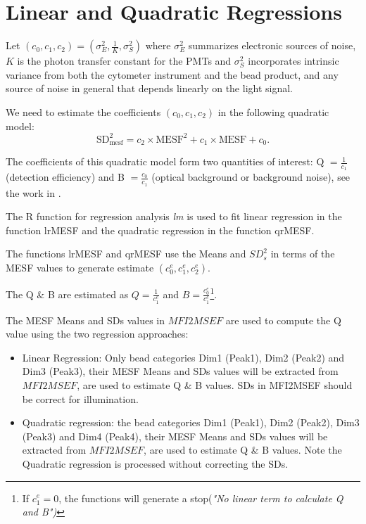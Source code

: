 \documentclass{article}
\begin{document}
\section{Linear and Quadratic Regressions}\label{reg}

Let $(c_0,c_1,c_2) = (\sigma_{E}^{2},\frac{1}{K},\sigma^{2}_{S})$ where $\sigma^2_{E}$ summarizes electronic sources of noise, $K$ is the photon transfer constant for the PMTs and  $\sigma^{2}_S$ incorporates intrinsic variance from both the cytometer instrument and the bead product, and any source of noise in general that depends linearly on the light signal. 

We need to estimate the coefficients $(c_0,c_1,c_2)$ in the following quadratic model:
\begin{equation}
\text{SD}_{\text{mesf}}^{2} =c_{2} \times \text{MESF}^{2}+ c_{1} \times \text{MESF}  +  c_{0}.
\end{equation}

The coefficients of this quadratic model form two quantities of interest: Q $= \frac{1}{c_{1}}$ (detection efficiency) and B $= \frac{c_{0}}{c_{1}}$  (optical background or background noise), see the work in \cite{f}.

The R function for regression analysis {\it lm} is used to fit linear regression in the function lrMESF and the quadratic regression in the function qrMESF. 

The functions lrMESF and qrMESF use the Means and $SD^{2}_{s}$ in terms of the MESF values to generate estimate $(c^{e}_0,c^{e}_1,c^{e}_2)$.
 
The Q \& B are estimated as $Q=\frac{1}{c^{e}_{1}}$ and $B=\frac{c^{e}_{0}}{c^{e}_{1}}$\footnote{ If $c^{e}_1=0$, the functions will generate a stop(\it{"No linear term to calculate Q and B"})}.

The MESF  Means and SDs values in $MFI2MSEF$ are used to compute the Q value using the two regression approaches:

\begin{itemize}
\item Linear Regression: Only bead categories Dim1 (Peak1), Dim2 (Peak2) and Dim3 (Peak3), their MESF Means and SDs values will be extracted from $MFI2MSEF$, are used to estimate Q \& B values. SDs in MFI2MSEF should be correct for illumination.

\item Quadratic regression: the bead categories Dim1 (Peak1), Dim2 (Peak2), Dim3 (Peak3) and Dim4 (Peak4), their MESF Means and SDs values will be extracted from $MFI2MSEF$, are used to estimate Q \& B values. Note the Quadratic regression is processed without correcting the SDs.
\end{itemize}
\end{document}
